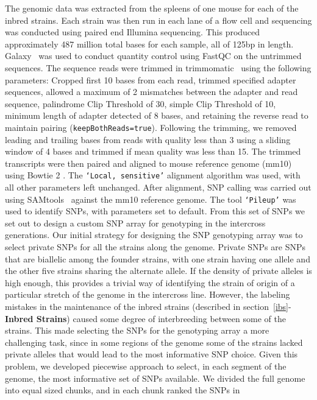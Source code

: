 \begin{refsection}
The genomic data was extracted from the spleens of one mouse for each of the
inbred strains. Each strain was then run in each lane of a flow cell and
sequencing was conducted using paired end Illumina sequencing. This produced
approximately 487 million total bases for each sample, all of 125bp in length.
Galaxy~\parencite{Goecks2010-hz} was used to conduct quantity control using
FastQC on the untrimmed sequences. The sequence reads were trimmed in
trimmomatic~\parencite{Bolger2014-ra} using the following parameters: Cropped
first 10 bases from each read, trimmed specified adapter sequences, allowed a
maximum of 2 mismatches between the adapter and read sequence, palindrome Clip
Threshold of 30, simple Clip Threshold of 10, minimum length of adapter
detected of 8 bases, and retaining the reverse read to maintain pairing
(\texttt{keepBothReads=true}). Following the trimming, we removed leading and
trailing bases from reads with quality less than 3 using a sliding window of 4
bases and trimmed if mean quality was less than 15. The trimmed transcripts
were then paired and aligned to mouse reference genome (mm10) using Bowtie 2
\parencite{Langmead2012-ev}. The \texttt{‘Local, sensitive’} alignment
algorithm was used, with all other parameters left unchanged. After alignment,
SNP calling was carried out using SAMtools~\parencite{Li2009-yr} against the
mm10 reference genome. The tool \texttt{‘Pileup’} was used to identify SNPs,
with  parameters set to default. From this set of SNPs we set out to design a
custom SNP array for genotyping in the intercross generations. Our initial
strategy for designing the SNP genotyping array was to select private SNPs for
all the strains along the genome. Private SNPs are SNPs that are biallelic
among the founder strains, with one strain having one allele and the other
five strains sharing the alternate allele. If the density of private alleles
is high enough, this provides a trivial way of identifying the strain of
origin of a particular stretch of the genome in the intercross line. However,
the labeling mistakes in the maintenance of the inbred strains (described in
section~\ref{ibs}-\textbf{Inbred Strains}) caused some degree of interbreeding
between some of the strains. This made selecting the SNPs for the genotyping
array a more challenging task, since in some regions of the genome some of the
strains lacked private alleles that would lead to the most informative SNP
choice. Given this problem, we developed piecewise approach to select, in each
segment of the genome, the most informative set of SNPs available. We divided
the full genome into equal sized chunks, and in each chunk ranked the SNPs in

\end{refsection}
